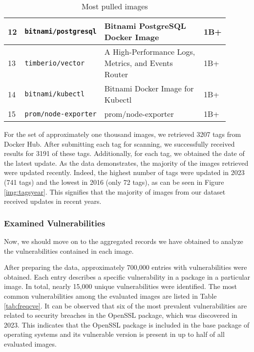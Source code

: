 \begin{table}[hbt]
\begin{tabular}{| p{0.02\linewidth} | p{0.3\linewidth} | p{0.5\linewidth} | p{0.08\linewidth} |}
        12 & \texttt{bitnami/postgresql}    & Bitnami PostgreSQL Docker Image                                                                 & 1B+   \\ \hline
        13 & \texttt{timberio/vector}       & A High-Performance Logs, Metrics, and Events Router                                             & 1B+   \\ \hline
        14 & \texttt{bitnami/kubectl}       & Bitnami Docker Image for Kubectl                                                                & 1B+   \\ \hline
        15 & \texttt{prom/node-exporter}    & prom/node-exporter                                                                              & 1B+   \\ \hline
    \end{tabular}
    \caption{Most pulled images}
    \label{tab:topimages}
\end{table}


For the set of approximately one thousand images, we retrieved 3207 tags from Docker Hub. After submitting each tag for scanning, we successfully received results for 3191 of these tags. Additionally, for each tag, we obtained the date of the latest update. As the data demonstrates, the majority of the images retrieved were updated recently. Indeed, the highest number of tags were updated in 2023 (741 tags) and the lowest in 2016 (only 72 tags), as can be seen in Figure \ref{img:tagsyear}. This signifies that the majority of images from our dataset received updates in recent years.




\FloatBarrier
\clearpage

\subsubsection*{Examined Vulnerabilities}

Now, we should move on to the aggregated records we have obtained to analyze the vulnerabilities contained in each image.

After preparing the data, approximately 700,000 entries with vulnerabilities were obtained. Each entry describes a specific vulnerability in a package in a particular image. In total, nearly 15,000 unique vulnerabilities were identified. The most common vulnerabilities among the evaluated images are listed in Table \ref{tab:freqcve}. It can be observed that six of the most prevalent vulnerabilities are related to security breaches in the OpenSSL package, which was discovered in 2023. This indicates that the OpenSSL package is included in the base package of operating systems and its vulnerable version is present in up to half of all evaluated images.


